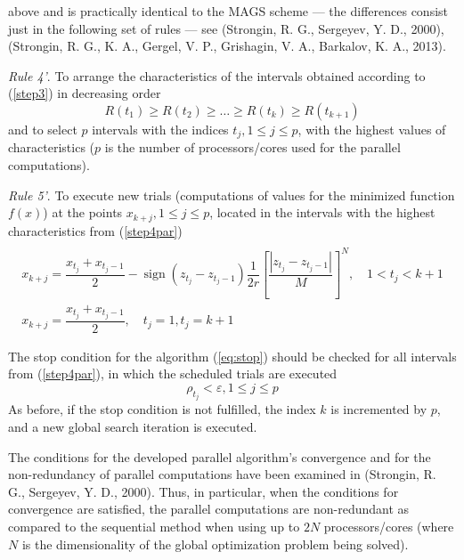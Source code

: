 \documentclass{gOMS2e}
\theoremstyle{plain}%
\theoremstyle{definition}
\DeclareMathOperator{\sign}{sign}
\theoremstyle{remark}
\begin{document}
above and is practically identical to the MAGS scheme --- the differences consist just in the
following set of rules --- see (Strongin, R. G., Sergeyev, Y. D., 2000), (Strongin, R. G., K. A., Gergel, V. P., Grishagin, V. A., Barkalov, K. A.,  2013).
\par
\textit{Rule 4'}. To arrange the characteristics of the intervals obtained according to (\ref{step3}) in decreasing order
\begin{equation}
\label{step4par}
R(t_1)\geqslant R(t_2)\geqslant \dots \geqslant R(t_{k})\geqslant R(t_{k+1})
\end{equation}
and to select \(p\) intervals with the indices \(t_j,1\leqslant j\leqslant p\), with
the highest values of characteristics (\(p\) is the number of processors/cores used for the parallel computations).
\par
\textit{Rule 5'}. To execute new trials (computations of values for the minimized
function \(f(x)\)) at the points \(x_{k+j},1\leqslant j\leqslant p\), located in the
intervals with the highest characteristics from (\ref{step4par})
\begin{equation}
\label{step5par}
\begin{array}{cr}\\
x_{k+j}=\dfrac{x_{t_j}+x_{t_j-1}}{2}-\sign(z_{t_j}-z_{t_j-1})\dfrac{1}{2r}\left[\dfrac{|z_{t_j}-z_{t_j-1}|}{M}\right]^N,\quad 1<t_j<k+1 \\
x_{k+j}=\dfrac{x_{t_j}+x_{t_j-1}}{2},\quad t_j=1,t_j=k+1
\end{array}
\end{equation}
\par
The stop condition for the algorithm (\ref{eq:stop}) should be checked for all
intervals from (\ref{step4par}), in which the scheduled trials are executed
\begin{equation}
  \label{eq:stop}
\rho_{t_j}<\varepsilon,1\leqslant j\leqslant p
\end{equation}
As before, if the stop condition is not fulfilled, the index \(k\) is
incremented by \(p\), and a new global search iteration is executed.
\par
The conditions for the developed parallel algorithm’s convergence and for the
non-redundancy of parallel computations have been examined in (Strongin, R. G., Sergeyev, Y. D., 2000).
Thus, in particular, when the conditions for convergence are satisfied, the parallel
computations are non-redundant as compared to the sequential method when using up to
\(2N\) processors/cores (where \(N\) is the dimensionality of the global optimization problem being solved).
\end{document}
